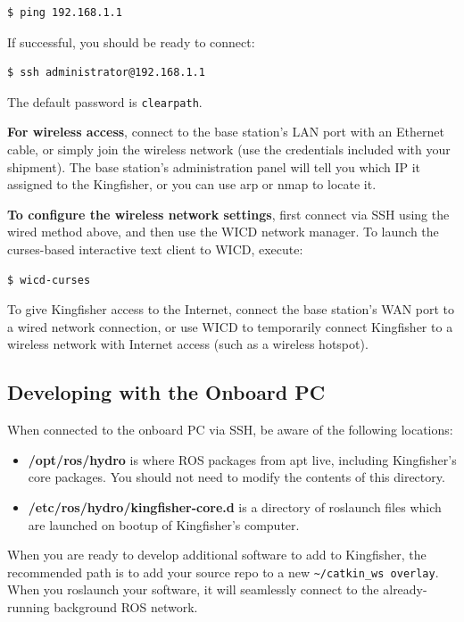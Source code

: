 \documentclass[]{clearpath-latex/clearpath-manual}
\begin{document}
\begin{lstlisting}
$ ping 192.168.1.1
\end{lstlisting}

If successful, you should be ready to connect:

\begin{lstlisting}
$ ssh administrator@192.168.1.1
\end{lstlisting}

The default password is \lstinline{clearpath}.

\textbf{For wireless access}, connect to the base station’s LAN port with an Ethernet cable, or simply join the wireless network (use the credentials included with your shipment). The base station’s administration panel will tell you which IP it assigned to the Kingfisher, or you can use arp or nmap to locate it.

\textbf{To configure the wireless network settings}, first connect via SSH using the wired method above, and then use the WICD network manager. To launch the curses-based interactive text client to WICD, execute:

\begin{lstlisting}
$ wicd-curses
\end{lstlisting}

To give Kingfisher access to the Internet, connect the base station’s WAN port to a wired network connection, or use WICD to temporarily connect Kingfisher to a wireless network with Internet access (such as a wireless hotspot).

\subsection{Developing with the Onboard PC}
When connected to the onboard PC via SSH, be aware of the following locations:

\begin{itemize}[nolistsep]
	\item \textbf{/opt/ros/hydro} is where ROS packages from apt live, including Kingfisher’s core packages. You should not need to modify the contents of this directory.
	\item \textbf{/etc/ros/hydro/kingfisher-core.d} is a directory of roslaunch files which are launched on bootup of Kingfisher’s computer.
\end{itemize}

When you are ready to develop additional software to add to Kingfisher, the recommended path is to add your source repo to a new \lstinline{~/catkin_ws overlay}. When you roslaunch your software, it will seamlessly connect to the already-running background ROS network.
\end{document}
